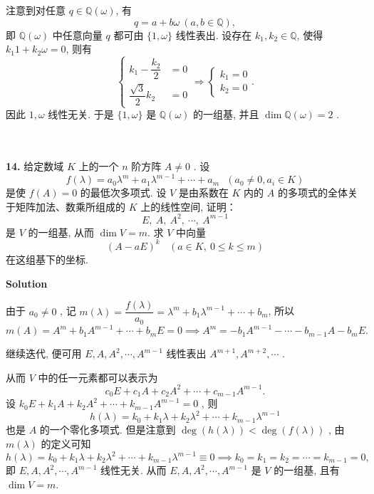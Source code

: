 \documentclass[11pt,a4paper,openany,oneside]{book}
\newcommand\Solution{\noindent\textbf{\textsf{Solution}}\par\medskip}
\begin{document}
注意到对任意 $q \in \mathbb{Q}(\omega)$, 有
\[ 
q = a + b \omega\ (a, b \in \mathbb{Q}), 
\]
即 $ \mathbb{Q}(\omega) $ 中任意向量 $ q $ 都可由 $ \{1, \omega\} $ 线性表出.  
设存在 $ k_1, k_2 \in \mathbb{Q} $, 使得 $ k_1 1 + k_2\omega = 0 $, 则有
\begin{equation*}
\left\{
\begin{aligned}
k_1 - \dfrac{k_2}{2} &= 0 \\
\dfrac{\sqrt{3}}{2}k_2 &= 0 
\end{aligned}
\right.   \Longrightarrow 
\left\{
\begin{aligned}
k_1 = 0  \\
k_2 = 0
\end{aligned}
\right.
.
\end{equation*}
因此 $ 1, \omega $ 线性无关. 于是 $ \{1, \omega\} $ 是 $ \mathbb{Q}(\omega) $ 的一组基, 并且 $ \dim  \mathbb{Q}(\omega) = 2 $ . \\  \\  \\



\hypertarget{4.1.14}{}
\begin{myexample}
\textbf{14.} 
给定数域 $ K $  上的一个 $ n $ 阶方阵 $ A \neq 0 $ . 设
 $$  f(\lambda) = a_0\lambda^m + a_1\lambda^{m-1} + \cdots + a_m \ \ \ (a_0 \neq 0, a_i \in K)  $$ 
是使 $ f(A) = 0 $ 的最低次多项式. 设 $ V $ 是由系数在 $ K $ 内的 $ A $ 的多项式的全体关于矩阵加法、数乘所组成的 $ K $ 上的线性空间, 证明：
\vspace{-1em}
 $$  E,\ A,\ A^2,\ \cdots,\ A^{m-1}   $$ 
是 $ V $ 的一组基, 从而 $ \dim V = m $. 求 $ V $ 中向量
\vspace{-1em}
 $$  (A - aE)^k  \ \ \ \ (a \in K, \ 0 \leq k \leq m) $$ 
在这组基下的坐标. 
\end{myexample}
\Solution

由于 $ a_0 \neq 0 $ , 记 $ m(\lambda) =\dfrac{f(\lambda)}{a_0} = \lambda^m + b_1\lambda^{m-1} + \cdots + b_m $, 所以
 $$ m(A) = A^m + b_1A^{m-1} + \cdots + b_mE=0\implies A^m = -b_1A^{m-1} - \cdots - b_{m-1}A - b_mE.$$ 

继续迭代, 便可用 $ E, A, A^2, \cdots, A^{m-1} $ 线性表出 $ A^{m+1}, A^{m+2}, \cdots $ .

从而 $ V $ 中的任一元素都可以表示为
 $$  c_0E + c_1A + c_2 A^2 + \cdots + c_{m-1}A^{m-1}.$$ 
设 $ k_0E + k_1A + k_2 A^2 + \cdots + k_{m-1} A^{m-1} = 0 $ , 则
 $$  h(\lambda) = k_0 + k_1\lambda + k_2\lambda^2 + \cdots + k_{m-1}\lambda^{m-1}  $$ 
也是 $ A $ 的一个零化多项式. 但是注意到 $ \deg(h(\lambda)) < \deg(f(\lambda)) $ , 由 $ m(\lambda) $ 的定义可知
 $$  h(\lambda) = k_0 + k_1\lambda + k_2\lambda^2 + \cdots + k_{m-1}\lambda^{m-1} \equiv 0\implies k_0 = k_1 = k_2 = \cdots = k_{m-1} = 0,$$ 
即 $ E, A, A^2, \cdots, A^{m-1} $ 线性无关. 从而 $ E, A, A^2, \cdots, A^{m-1} $ 是 $ V $ 的一组基, 且有 $ \dim  V = m $.
\end{document}
